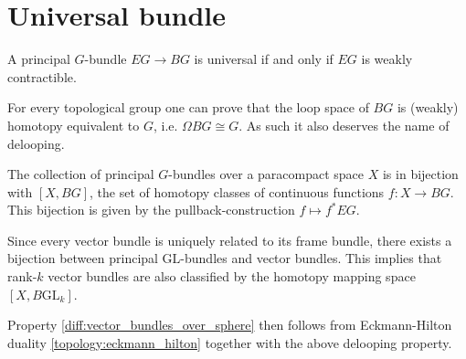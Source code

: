 \section{Universal bundle}

    \begin{property}
        A principal $G$-bundle $EG\rightarrow BG$ is universal if and only if $EG$ is weakly contractible.
    \end{property}
    \begin{property}[Delooping]\label{diff:delooping}
        For every topological group one can prove that the loop space of $BG$ is (weakly) homotopy equivalent to $G$, i.e. $\Omega BG\cong G$. As such it also deserves the name of delooping.
    \end{property}

    \begin{property}[Classification]\label{diff:prin:classification}
        The collection of principal $G$-bundles over a paracompact space $X$ is in bijection with $[X, BG]$, the set of homotopy classes of continuous functions $f:X\rightarrow BG$. This bijection is given by the pullback-construction $f\mapsto f^*EG$.
    \end{property}
    \begin{result}
        Since every vector bundle is uniquely related to its frame bundle, there exists a bijection between principal $\text{GL}$-bundles and vector bundles. This implies that rank-$k$ vector bundles are also classified by the homotopy mapping space $[X, B\text{GL}_k]$.

        Property \ref{diff:vector_bundles_over_sphere} then follows from Eckmann-Hilton duality \ref{topology:eckmann_hilton} together with the above delooping property.
    \end{result}


